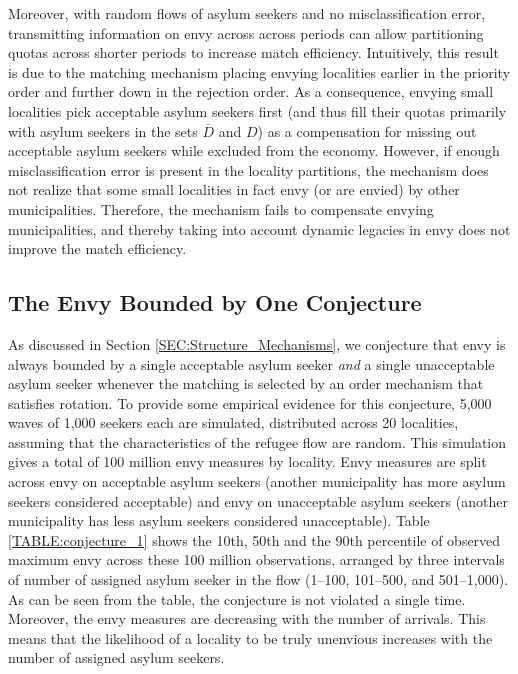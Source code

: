 \documentclass[12pt,fleqn]{article}
\begin{document}
Moreover, with random flows of asylum seekers and no misclassification error, transmitting information on envy across across periods can allow partitioning quotas across shorter periods to increase match efficiency. Intuitively, this result is due to the matching mechanism placing envying localities earlier in the priority order and further down in the rejection order. As a consequence, envying small localities pick acceptable asylum seekers first (and thus fill their quotas primarily with asylum seekers in the sets $\overline{D}$ and $D$) as a compensation for missing out acceptable asylum seekers while excluded from the economy. However, if enough misclassification error is present in the locality partitions, the mechanism does not realize that some small localities in fact envy (or are envied) by other municipalities. Therefore, the mechanism fails to compensate envying municipalities, and thereby taking into account dynamic legacies in envy does not improve the match efficiency.

\subsection{The Envy Bounded by One Conjecture}
As discussed in Section \ref{SEC:Structure_Mechanisms}, we conjecture that envy is always bounded by a single acceptable asylum seeker \emph{and} a single unacceptable asylum seeker whenever the matching is selected by an order mechanism that satisfies rotation. To provide some empirical evidence for this conjecture, 5,000 waves of 1,000 seekers each are simulated, distributed across 20 localities, assuming that the characteristics of the refugee flow are random. This simulation gives a total of 100 million envy measures by locality. Envy measures are split across envy on acceptable asylum seekers (another municipality has more asylum seekers considered acceptable) and envy on unacceptable asylum seekers (another municipality has less asylum seekers considered unacceptable). Table \ref{TABLE:conjecture_1} shows the 10th, 50th and the 90th percentile of observed maximum envy across these 100 million observations, arranged by three intervals of number of assigned asylum seeker in the flow (1--100, 101--500, and 501--1,000). As can be seen from the table, the conjecture is not violated a single time. Moreover, the envy measures are decreasing with the number of arrivals. This means that the likelihood of a locality to be truly unenvious increases with the number of assigned asylum seekers.
\end{document}
